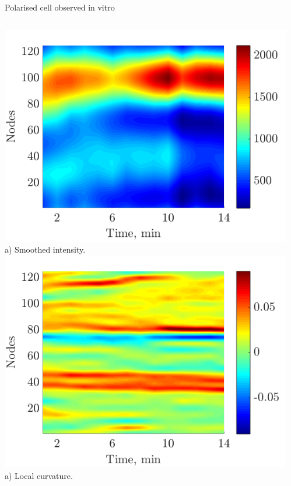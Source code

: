 \documentclass[mathserif,11pt]{beamer}
\begin{document}
\begin{frame}{Polarised cell observed in vitro}
\begin{columns}
	\begin{column}{0.35\textwidth}
	\centering
	\includegraphics[scale=0.3]{Figures/polarised_smoothed_akt.png}\vfil
	\footnotesize{a) Smoothed intensity.}
	\vfil
	\includegraphics[scale=0.3]{Figures/polarised_curvature.png}\vfil	
	\footnotesize{a) Local curvature.}
\end{column}
\begin{column}{0.35\textwidth}
	\centering

\end{column}
\end{columns}
\end{frame}
\end{document}
